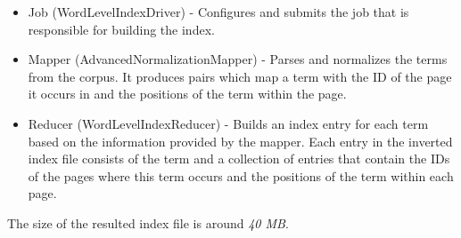 \documentclass[a4paper, notitlepage]{report}
\begin{document}
\begin{itemize}
	\item Job (WordLevelIndexDriver) - Configures and submits the job that is responsible for building the index.
	\item Mapper (AdvancedNormalizationMapper) - Parses and normalizes the terms from the corpus. It produces pairs which map a term with the ID of the page it occurs in and the positions of the term within the page.
	\item Reducer (WordLevelIndexReducer) - Builds an index entry for each term based on the information provided by the mapper. Each entry in the inverted index file consists of the term and a collection of entries that contain the IDs of the pages where this term occurs and the positions of the term within each page.  
\end{itemize}

The size of the resulted index file is around \emph{40 MB}.
\end{document}
